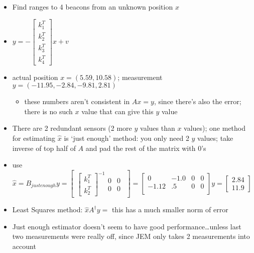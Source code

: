 \documentclass[10pt,letterpaper]{article}
\begin{document}
\begin{itemize}
\item Find ranges to 4 beacons from an unknown position $x$
\item $y = - \begin{bmatrix}
           k _{1} ^{T} \\ k _{2 } ^{T} \\ k _{3} ^{T} \\ k _{4} ^{T} 
         \end{bmatrix} x + v$
\item actual position $x=(5.59, 10.58)$; measurement $y=(-11.95, -2.84, -9.81, 2.81)$

\begin{itemize}
\item these numbers aren't consistent in $Ax=y$, since there's also the error; there is no such $x$ value that can give this $y$ value
\end{itemize}

\item There are 2 redundant sensors (2 more $y$ values than $x$ values); one method for estimating $\hat x$ is `just enough' method: you only need 2 $y$ values; take inverse of top half of $A$ and pad the rest of the matrix with 0's
\item use $\hat x = B _{just enough} y = \begin{bmatrix}\begin{bmatrix} k_1 ^{T} \\ k_2 ^{T} \end{bmatrix} ^{-1} \begin{matrix} 0 & 0 \\ 0 & 0 \end{matrix}\end{bmatrix} = \begin{bmatrix}
                                           0 & -1.0 & 0 & 0 \\ -1.12 &   .5 & 0 & 0 \\   
                                     \end{bmatrix} y = \begin{bmatrix} 2.84 \\ 11.9 \end{bmatrix}$
\item Least Squares method: $\hat x A ^{\dagger} y =$ this has a much smaller norm of error
\item Just enough estimator doesn't seem to have good performance\ldots{}unless last two measurements were really off, since JEM only takes 2 measurements into account
\end{itemize}
\end{document}
